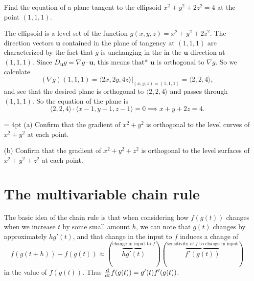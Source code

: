 \documentclass{watsonbook}
\begin{document}
\begin{example}{}{}
  Find the equation of a plane tangent to the ellipsoid $x^2 + y^2 +
  2z^2  = 4$ at the point $(1,1,1)$. 
\end{example}

\begin{solution}
  The ellipsoid is a level set of the function
  $g(x,y,z) = x^2 + y^2 + 2z^2$. The direction vectors $\mathbf{u}$
  contained in the plane of tangency at $(1,1,1)$ are characterized
  by the fact that $g$ is unchanging in the in the $\mathbf{u}$
  direction at $(1,1,1)$. Since
  $D_{\mathbf{u}}g = \nabla g \cdot \mathbf{u}$, this means that*
  $\mathbf{u}$ is orthogonal to $\nabla g$. So we calculate
  \[
    (\nabla g)(1,1,1) = \left.\langle 2x, 2y, 4z \rangle\right|_{(x,y,z) =
      (1,1,1)} = \langle 2, 2, 4 \rangle, 
  \]
  and see that the desired plane is orthogonal to $\langle 2, 2, 4
  \rangle$ and passes through $(1,1,1)$. So the equation of the
  plane is 
  \[
    \langle 2, 2, 4 \rangle \cdot \langle x - 1, y - 1, z - 1
    \rangle = 0 \implies \boxed{x + y + 2z = 4}. 
  \]
\end{solution}

  \begin{exercise}{}{} \parskip = 4pt 
    (a) Confirm that the gradient of $x^2 + y^2$ is orthogonal to the level
    curves of $x^2 + y^2$ at each point.

    (b) Confirm that the gradient of
    $x^2 + y^2 + z^2 $ is orthogonal to the level surfaces of
    $x^2 + y^2 + z^2$ at each point.
  \end{exercise}

  \section{The multivariable chain rule} \label{sec:chainrule} 


  The basic idea of the chain rule is that when considering how
  $f(g(t))$ changes when we increase $t$ by some small amount $h$, we
  can note that $g(t)$ changes by approximately $hg'(t)$, and that
  change in the input to $f$ induces a change of
  \[
    f(g(t+h)) - f(g(t)) \approx \left(
      \overbrace{hg'(t)}^{\text{change in input to $f$}} 
    \right) \left( 
    \overbrace{f'(g(t))}^{\text{sensitivity of
        $f$ to change in input}}
    \right) 
  \]
  in the value of $f(g(t))$. Thus $\tfrac{\mathrm{d}}{\mathrm{d} t} f(g(t)) =
  g'(t)f'(g(t))$. 
\end{document}
